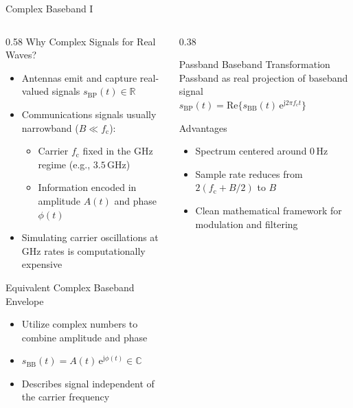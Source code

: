 \begin{frame}{Complex Baseband I}
\begin{columns}[T,onlytextwidth]
    \begin{column}{0.58\textwidth}
        Why Complex Signals for Real Waves?\\
        \begin{itemize}
            \item Antennas emit and capture real-valued signals $s_\mathrm{BP}(t) \in \mathbb{R}$
            \item Communications signals usually narrowband ($B \ll f_\mathrm{c}$):
            \begin{itemize}
                \item Carrier $f_\mathrm{c}$ fixed in the GHz regime (e.g., $3.5\,\mathrm{GHz}$)
                \item Information encoded in amplitude $A(t)$ and phase $\phi(t)$
            \end{itemize}
            \item Simulating carrier oscillations at GHz rates is computationally expensive
        \end{itemize}
        \vspace{0.8em}
        Equivalent Complex Baseband Envelope\\
        \begin{itemize}
            \item Utilize complex numbers to combine amplitude and phase
            \item $s_\mathrm{BB}(t) = A(t) \,\mathrm{e}^{\mathrm{j} \phi(t)} \in \mathbb{C}$
            \item Describes signal independent of the carrier frequency
        \end{itemize}
    \end{column}

    \begin{column}{0.38\textwidth}
        \begin{block}{Passband Baseband Transformation}
            Passband as real projection of baseband signal\\
            \vspace{0.5em}
            \centering
            $s_\mathrm{BP}(t) = \mathrm{Re}\Big\{ s_\mathrm{BB}(t) \,\mathrm{e}^{\mathrm{j} 2\pi f_\mathrm{c} t} \Big\}$
        \end{block}

        \begin{block}{Advantages}
            \begin{itemize}
                \item Spectrum centered around $0\,\mathrm{Hz}$
                \item Sample rate reduces from $2(f_\mathrm{c} + B/2)$ to $B$
                \item Clean mathematical framework for modulation and filtering
            \end{itemize}
        \end{block}
    \end{column}
\end{columns}
\end{frame}

